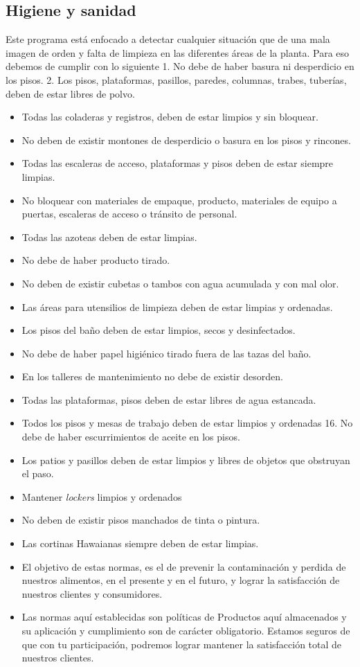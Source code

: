 \subsection{Higiene y sanidad}
Este programa está enfocado a detectar cualquier situación que de una mala imagen de orden y falta de limpieza en las diferentes áreas de la planta. Para eso debemos de cumplir con lo siguiente 1. No debe de haber basura ni desperdicio en los pisos.
2. Los pisos, plataformas, pasillos, paredes, columnas, trabes, tuberías, deben de estar libres de polvo.

\begin{itemize}
	\item Todas las coladeras y registros, deben de estar limpios y sin bloquear.
	\item No deben de existir montones de desperdicio o basura en los pisos y rincones.
	\item Todas las escaleras de acceso, plataformas y pisos deben de estar siempre limpias.
	\item No bloquear con materiales de empaque, producto, materiales de equipo a puertas, escaleras de acceso o tránsito de personal.
	\item Todas las azoteas deben de estar limpias.
	\item No debe de haber producto tirado.
	\item No deben de existir cubetas o tambos con agua acumulada y con mal olor.
	\item Las áreas para utensilios de limpieza deben de estar limpias y ordenadas.
	\item Los pisos del baño deben de estar limpios, secos y desinfectados.
	\item No debe de haber papel higiénico tirado fuera de las tazas del baño.
	\item En los talleres de mantenimiento no debe de existir desorden.
	\item Todas las plataformas, pisos deben de estar libres de agua estancada.
	\item Todos los pisos y mesas de trabajo deben de estar limpios y ordenadas 16. No debe de haber escurrimientos de aceite en los pisos.
	\item Los patios y pasillos deben de estar limpios y libres de objetos que obstruyan el paso.
	\item Mantener \emph{lockers} limpios y ordenados
	\item No deben de existir pisos manchados de tinta o pintura.
	\item Las cortinas Hawaianas siempre deben de estar limpias.
	\item El objetivo de estas normas, es el de prevenir la contaminación y perdida de nuestros alimentos, en el presente y en el futuro, y lograr la satisfacción de nuestros clientes y consumidores.
	\item Las normas aquí establecidas son políticas de Productos aquí almacenados y su aplicación y cumplimiento son de carácter obligatorio.
	      Estamos seguros de que con tu participación, podremos lograr mantener la satisfacción total de nuestros clientes.
\end{itemize}


